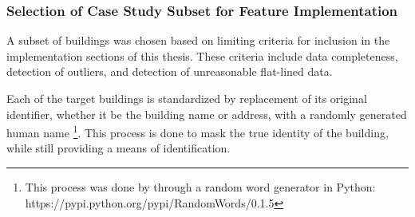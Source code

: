 \subsubsection{Selection of Case Study Subset for Feature Implementation}
\label{casestudysubset}

A subset of buildings was chosen based on limiting criteria for inclusion in the implementation sections of this thesis. These criteria include data completeness, detection of outliers, and detection of unreasonable flat-lined data.

Each of the target buildings is standardized by replacement of its original identifier, whether it be the building name or address, with a randomly generated human name \footnote{This process was done by through a random word generator in Python: https://pypi.python.org/pypi/RandomWords/0.1.5}. This process is done to mask the true identity of the building, while still providing a means of identification.